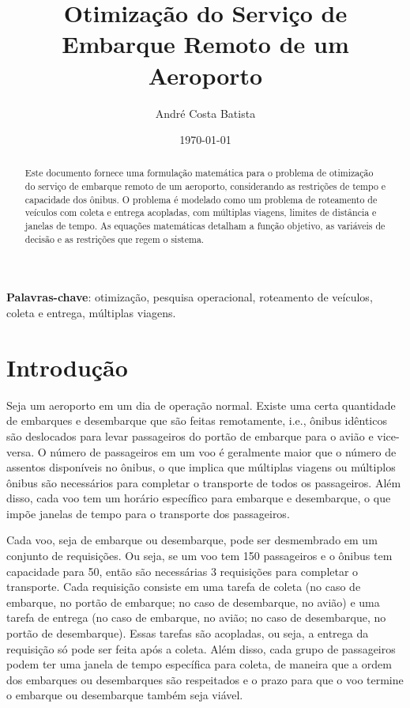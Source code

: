 \documentclass[12pt, a4paper]{article}
\title{Otimização do Serviço de Embarque Remoto de um Aeroporto}
\author{André Costa Batista}
\date{\today}
\begin{document}
\maketitle

\begin{abstract}
    Este documento fornece uma formulação matemática para o problema de otimização do serviço de embarque remoto de um aeroporto, considerando as restrições de tempo e capacidade dos ônibus. O problema é modelado como um problema de roteamento de veículos com coleta e entrega acopladas, com múltiplas viagens, limites de distância e janelas de tempo. As equações matemáticas detalham a função objetivo, as variáveis de decisão e as restrições que regem o sistema.
\end{abstract}

\noindent \textbf{Palavras-chave}: otimização, pesquisa operacional, roteamento de veículos, coleta e entrega, múltiplas viagens.

\section{Introdução}

Seja um aeroporto em um dia de operação normal. Existe uma certa quantidade de embarques e desembarque que são feitas remotamente, i.e., ônibus idênticos são deslocados para levar passageiros do portão de embarque para o avião e vice-versa. O número de passageiros em um voo é geralmente maior que o número de assentos disponíveis no ônibus, o que implica que múltiplas viagens ou múltiplos ônibus são necessários para completar o transporte de todos os passageiros. Além disso, cada voo tem um horário específico para embarque e desembarque, o que impõe janelas de tempo para o transporte dos passageiros.

Cada voo, seja de embarque ou desembarque, pode ser desmembrado em um conjunto de requisições. Ou seja, se um voo tem 150 passageiros e o ônibus tem capacidade para 50, então são necessárias 3 requisições para completar o transporte. Cada requisição consiste em uma tarefa de coleta (no caso de embarque, no portão de embarque; no caso de desembarque, no avião) e uma tarefa de entrega (no caso de embarque, no avião; no caso de desembarque, no portão de desembarque). Essas tarefas são acopladas, ou seja, a entrega da requisição só pode ser feita após a coleta. Além disso, cada grupo de passageiros podem ter uma janela de tempo específica para coleta, de maneira que a ordem dos embarques ou desembarques são respeitados e o prazo para que o voo termine o embarque ou desembarque também seja viável.
\end{document}
